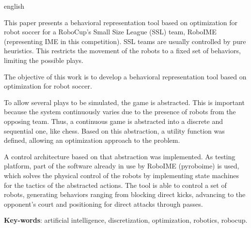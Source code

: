 \begin{resumo}[Abstract]\begin{otherlanguage*}{english}

  This paper presents a behavioral representation tool based on optimization for
  robot soccer for a RoboCup's Small Size League (SSL) team, RoboIME
  (representing IME in this competition).  SSL teams are usually controlled by
  pure heuristics.  This restricts the movement of the robots to a fixed set of
  behaviors, limiting the possible plays.

  The objective of this work is to develop a behavioral representation tool
  based on optimization for robot soccer.

  To allow several plays to be simulated, the game is abstracted.  This is
  important because the system continuously varies due to the presence of robots
  from the opposing team.  Thus, a continuous game is abstracted into a discrete
  and sequential one, like chess.  Based on this abstraction, a utility function
  was defined, allowing an optimization approach to the problem.

  A control architecture based on that abstraction was implemented.  As testing
  platform, part of the software already in use by RoboIME (pyroboime) is used,
  which solves the physical control of the robots by implementing state machines
  for the tactics of the abstracted actions.  The tool is able to control a set
  of robots, generating behaviors ranging from blocking direct kicks, advancing
  to the opponent's court and positioning for direct attacks through passes.

  \textbf{Key-words}: artificial intelligence, discretization, optimization, robotics, robocup.
\end{otherlanguage*}\end{resumo}


